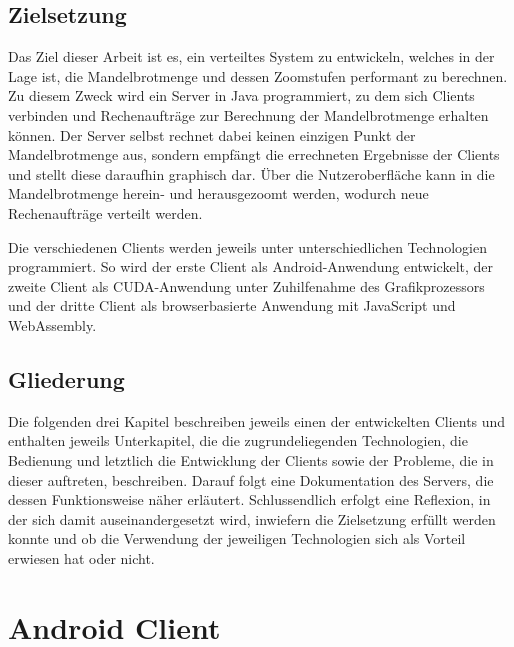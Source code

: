 \documentclass[12pt, onecolumn, notitlepage]{scrartcl}
\begin{document}
\subsection{Zielsetzung}
Das Ziel dieser Arbeit ist es, ein verteiltes System zu entwickeln, welches in der Lage ist, die Mandelbrotmenge und dessen Zoomstufen performant zu berechnen. Zu diesem Zweck wird ein Server in Java programmiert, zu dem sich Clients verbinden und Rechenaufträge zur Berechnung der Mandelbrotmenge erhalten können. Der Server selbst rechnet dabei keinen einzigen Punkt der Mandelbrotmenge aus, sondern empfängt die errechneten Ergebnisse der Clients und stellt diese daraufhin graphisch dar. Über die Nutzeroberfläche kann in die Mandelbrotmenge herein- und herausgezoomt werden, wodurch neue Rechenaufträge verteilt werden.  \par
Die verschiedenen Clients werden jeweils unter unterschiedlichen Technologien programmiert. So wird der erste Client als Android-Anwendung entwickelt, der zweite Client als CUDA-Anwendung unter Zuhilfenahme des Grafikprozessors und der dritte Client als browserbasierte Anwendung mit JavaScript und WebAssembly. 
\subsection{Gliederung}
Die folgenden drei Kapitel beschreiben jeweils einen der entwickelten Clients und enthalten jeweils Unterkapitel, die die zugrundeliegenden Technologien, die Bedienung und letztlich die Entwicklung der Clients sowie der Probleme, die in dieser auftreten, beschreiben. Darauf folgt eine Dokumentation des Servers, die dessen Funktionsweise näher erläutert. Schlussendlich erfolgt eine Reflexion, in der sich damit auseinandergesetzt wird, inwiefern die Zielsetzung erfüllt werden konnte und ob die Verwendung der jeweiligen Technologien sich als Vorteil erwiesen hat oder nicht.


\section{Android Client}
\end{document}
